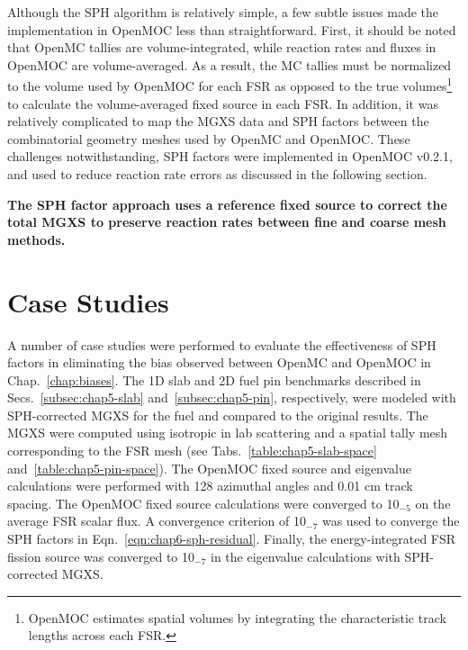 Although the \ac{SPH} algorithm is relatively simple, a few subtle issues made the implementation in OpenMOC less than straightforward. First, it should be noted that OpenMC tallies are volume-integrated, while reaction rates and fluxes in OpenMOC are volume-averaged. As a result, the \ac{MC} tallies must be normalized to the volume used by OpenMOC for each \ac{FSR} as opposed to the true volumes\footnote{OpenMOC estimates spatial volumes by integrating the characteristic track lengths across each \ac{FSR}.} to calculate the volume-averaged fixed source in each \ac{FSR}. In addition, it was relatively complicated to map the \ac{MGXS} data and \ac{SPH} factors between the combinatorial geometry meshes used by OpenMC and OpenMOC. These challenges notwithstanding, \ac{SPH} factors were implemented in OpenMOC v0.2.1, and used to reduce reaction rate errors as discussed in the following section.

\begin{emphbox}
\textbf{The \ac{SPH} factor approach uses a reference fixed source to correct the total \ac{MGXS} to preserve reaction rates between fine and coarse mesh methods.}
\end{emphbox}

\section{Case Studies}
\label{sec:chap6-sph-case-studies}

A number of case studies were performed to evaluate the effectiveness of \ac{SPH} factors in eliminating the bias observed between OpenMC and OpenMOC in Chap.~\ref{chap:biases}. The 1D slab and 2D fuel pin benchmarks described in Secs.~\ref{subsec:chap5-slab} and~\ref{subsec:chap5-pin}, respectively, were modeled with \ac{SPH}-corrected \ac{MGXS} for the fuel and compared to the original results. The \ac{MGXS} were computed using isotropic in lab scattering and a spatial tally mesh corresponding to the \ac{FSR} mesh (see Tabs.~\ref{table:chap5-slab-space} and~\ref{table:chap5-pin-space}). The OpenMOC fixed source and eigenvalue calculations were performed with 128 azimuthal angles and 0.01 cm track spacing. The OpenMOC fixed source calculations were converged to 10$_{-5}$ on the average \ac{FSR} scalar flux. A convergence criterion of 10$_{-7}$ was used to converge the \ac{SPH} factors in Eqn.~\ref{eqn:chap6-sph-residual}. Finally, the energy-integrated \ac{FSR} fission source was converged to 10$_{-7}$ in the eigenvalue calculations with \ac{SPH}-corrected \ac{MGXS}.

